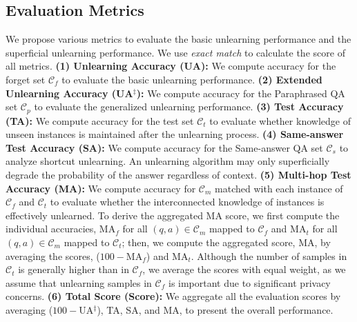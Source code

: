 \subsection{Evaluation Metrics}
\label{bench:eval_metrics}
We propose various metrics to evaluate the basic unlearning performance and the superficial unlearning performance. We use \textit{exact match} to calculate the score of all metrics.
\textbf{(1) Unlearning Accuracy (UA):} We compute accuracy for the forget set $\mathcal{C}_{f}$ to evaluate the basic unlearning performance.
\textbf{(2) Extended Unlearning Accuracy (UA$^{\ddag}$):} We compute accuracy for the Paraphrased QA set $\mathcal{C}_{p}$ to evaluate the generalized unlearning performance.
\textbf{(3) Test Accuracy (TA):} We compute accuracy for the test set $\mathcal{C}_{t}$ to evaluate whether knowledge of unseen instances is maintained after the unlearning process.
\textbf{(4) Same-answer Test Accuracy (SA):} We compute accuracy for the Same-answer QA set $\mathcal{C}_{s}$ to analyze shortcut unlearning. An unlearning algorithm may only superficially degrade the probability of the answer regardless of context.
\textbf{(5) Multi-hop Test Accuracy (MA):} We compute accuracy for $\mathcal{C}_{m}$ matched with each instance of $\mathcal{C}_{f}$ and $\mathcal{C}_{t}$ to evaluate whether the interconnected knowledge of instances is effectively unlearned.
To derive the aggregated MA score, we first compute the individual accuracies, MA$_{f}$ for all $(q,a) \in \mathcal{C}_{m}$ mapped to $\mathcal{C}_{f}$ and MA$_{t}$ for all $(q,a) \in \mathcal{C}_{m}$ mapped to $\mathcal{C}_{t}$; then, we compute the aggregated score, MA, by averaging the scores, ($100-$MA$_{f}$) and MA$_{t}$.
Although the number of samples in $\mathcal{C}_{t}$ is generally higher than in $\mathcal{C}_{f}$, we average the scores with equal weight, as we assume that unlearning samples in $\mathcal{C}_{f}$ is important due to significant privacy concerns.
\textbf{(6) Total Score (Score):} We aggregate all the evaluation scores by averaging ($100-$UA$^{\ddag}$), TA, SA, and MA, to present the overall performance.



